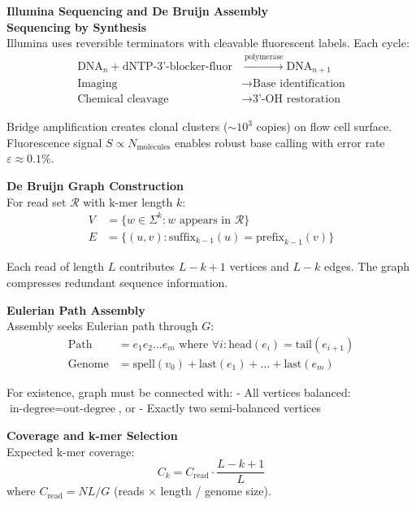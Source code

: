 \begin{technical}
{\Large\textbf{Illumina Sequencing and De Bruijn Assembly}}\\[0.7em]

\textbf{Sequencing by Synthesis}\\[0.5em]
Illumina uses reversible terminators with cleavable fluorescent labels. Each cycle:
\begin{align}
\text{DNA}_n + \text{dNTP-3'-blocker-fluor} &\xrightarrow{\text{polymerase}} \text{DNA}_{n+1}\\
\text{Imaging} &\rightarrow \text{Base identification}\\
\text{Chemical cleavage} &\rightarrow \text{3'-OH restoration}
\end{align}

Bridge amplification creates clonal clusters ($\sim10^3$ copies) on flow cell surface. Fluorescence signal $S \propto N_{\text{molecules}}$ enables robust base calling with error rate $\varepsilon \approx 0.1\%$.

\textbf{De Bruijn Graph Construction}\\[0.5em]
For read set $\mathcal{R}$ with k-mer length $k$:
\begin{align}
V &= \{w \in \Sigma^k : w \text{ appears in } \mathcal{R}\}\\
E &= \{(u,v) : \text{suffix}_{k-1}(u) = \text{prefix}_{k-1}(v)\}
\end{align}

Each read of length $L$ contributes $L-k+1$ vertices and $L-k$ edges. The graph compresses redundant sequence information.

\textbf{Eulerian Path Assembly}\\[0.5em]
Assembly seeks Eulerian path through $G$:
\begin{align}
\text{Path} &= e_1e_2...e_m \text{ where } \forall i: \text{head}(e_i) = \text{tail}(e_{i+1})\\
\text{Genome} &= \text{spell}(v_0) + \text{last}(e_1) + ... + \text{last}(e_m)
\end{align}

For existence, graph must be connected with:
- All vertices balanced: $\text{in-degree} = \text{out-degree}$, or
- Exactly two semi-balanced vertices

\textbf{Coverage and k-mer Selection}\\[0.5em]
Expected k-mer coverage:
\[
C_k = C_{\text{read}} \cdot \frac{L-k+1}{L}
\]
where $C_{\text{read}} = NL/G$ (reads × length / genome size).


\end{technical}
